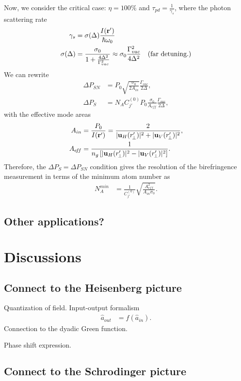 \documentclass[preprint,aps,pra,onecolumn]{revtex4-1} %
\begin{document}
Now, we consider the critical case: $\eta =100\%$ and $\tau_{pd} = \frac{1}{\gamma_s}$, where the photon scattering rate
\begin{align}
\gamma_s &= \sigma(\Delta) \frac{I(\mathbf{r}')}{\hbar \omega_0} \\
\sigma(\Delta) &=\frac{\sigma_0}{1+\frac{4\Delta^2}{\Gamma^2_{vac}}}\approx \sigma_0 \frac{\Gamma_{vac}^2}{4\Delta^2} \quad \text{(far detuning.)}
\end{align}
We can rewrite 
\begin{align}
\Delta P_{SN} &=P_0\sqrt{\frac{ \sigma_0 }{2A_{in}}}\frac{\Gamma_{vac}}{2\Delta},\\
\Delta P_S &= N_A C_{j'}^{(0)}P_0 \frac{\sigma_0}{A_{e\!f\!f}}\frac{\Gamma_{vac}}{2\Delta}, 
\end{align}
with the effective mode areas
\begin{align}
A_{in } &= \frac{P_0}{I(\mathbf{r}')}=\frac{2}{| \mathbf{u}_H(r'_{\!\perp})|^2+ | \mathbf{u}_V(r'_{\!\perp})|^2},\\
A_{e\!f\!f} &= \frac{1}{n_g\left[ | \mathbf{u}_H(r'_{\!\perp})|^2- | \mathbf{u}_V(r'_{\!\perp})|^2\right]}.
\end{align}
Therefore, the $ \Delta P_S = \Delta P_{SN}$ condition gives the resolution of the birefringence measurement in terms of the minimum atom number as
\begin{align}
N^{min}_A &= \frac{1}{C_{j'}^{(0)}}\sqrt{\frac{A_{e\!f\!f}^2}{A_{in}\sigma_0}}.
\end{align}

\subsection{Other applications?} 


\section{Discussions}

\subsection{Connect to the Heisenberg picture}
Quantization of field. Input-output formalism
\begin{align}
\hat{a}_{out} &= f(\hat{a}_{in}).
\end{align}
Connection to the dyadic Green function.

Phase shift expression. 

\subsection{Connect to the Schrodinger picture}
\end{document}
